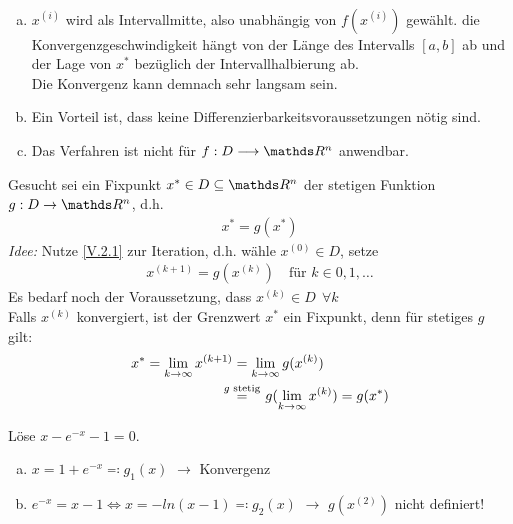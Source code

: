 \begin{Beme}~
	\begin{enumerate}[a)]
		\item $x^{(i)} $ wird als Intervallmitte, also unabhängig von $f(x^{(i)})$
		gewählt. die Konvergenzgeschwindigkeit hängt von der Länge des Intervalls $[a,b]$ ab
		und der Lage von $x^{*}$ bezüglich der Intervallhalbierung ab. \\
		Die Konvergenz kann demnach sehr langsam sein.
		\item Ein Vorteil ist, dass keine Differenzierbarkeitsvoraussetzungen nötig sind.
		\item Das Verfahren ist nicht für $f:D\longrightarrow \R^n$ anwendbar.
	\end{enumerate}
\end{Beme}


Gesucht sei ein Fixpunkt $x^{*}\in D\subseteq \R^n$ der stetigen Funktion
$g:D\rightarrow\R^n$, d.h.
\begin{gather}
x^{*} = g(x^{*}) \label{V.2.1}
\end{gather}
\textit{Idee:}
Nutze \eqref{V.2.1} zur Iteration, d.h. wähle $x^{(0)}\in D$,
setze 
\begin{gather}
x^{(k+1)} = g(x^{(k)})  \quad \text{für } k\in 0, 1, \dotsc
\label{V.2.2}
\end{gather}
Es bedarf noch der Voraussetzung, dass $x^{(k)}\in D~~ \forall k$ \\
Falls $x^{(k)}$ konvergiert, ist der Grenzwert $x^{*}$ ein Fixpunkt,
denn für stetiges $g$ gilt:
\begin{align} \nonumber
x^{*} = \lim_{k\rightarrow \infty}x^{(k+1)} &= \lim_{k\rightarrow \infty}g(x^{(k)}) \\
& \overset{\mathclap{g \text{ stetig}} }{=}\quad g(\lim_{k\rightarrow \infty}x^{(k)}) = g(x^{*})
\label{V.2.3}
\end{align}

\begin{Bspe}
	Löse $x-e^{-x}-1 = 0$.
	\begin{enumerate}[a)]
		\item $x=1+e^{-x} \eqqcolon g_1(x)$
		$\longrightarrow$ Konvergenz
		\item $e^{-x} = x-1   \Leftrightarrow x= -ln(x-1) \eqqcolon g_2(x)$
		$\longrightarrow$ $g(x^{(2)}) $ nicht definiert!
	\end{enumerate}
\end{Bspe}

